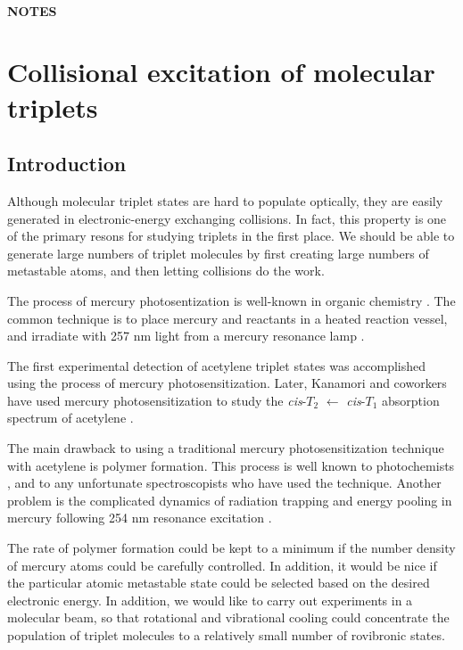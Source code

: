 \documentclass[12pt]{mitthesis}
\begin{document}
\tableofcontents
\clearpage

\subsubsection*{NOTES}
\clearpage

\chapter{Collisional excitation of molecular triplets}

\section{Introduction}


Although molecular triplet states are hard to populate optically, they
are easily generated in electronic-energy exchanging collisions.  In
fact, this property is one of the primary resons for studying triplets
in the first place.  We should be able to generate large numbers of
triplet molecules by first creating large numbers of metastable atoms,
and then letting collisions do the work.

The process of mercury photosentization is well-known in organic
chemistry \cite{brown89, brown88, crabtree92, cvetanovic64,
  phillips74, strausz70}.  The common technique is to place mercury
and reactants in a heated reaction vessel, and irradiate with 257 nm
light from a mercury resonance lamp \cite{brown87}.

The first experimental detection of acetylene triplet states was
accomplished using the process of mercury photosensitization.  Later,
Kanamori and coworkers have used mercury photosensitization to study
the \emph{cis}-$T_2$ $\leftarrow$ \emph{cis}-$T_1$ absorption spectrum
of acetylene \cite{kanamori07}.

The main drawback to using a traditional mercury photosensitization
technique with acetylene is polymer formation.  This process is well
known to photochemists \cite{shida58, leroy44}, and to any unfortunate
spectroscopists who have used the technique.  Another problem is the
complicated dynamics of radiation trapping and energy pooling in
mercury following 254 nm resonance excitation \cite{menningen00,
  herd05, majetich89, majetich91}.

The rate of polymer formation could be kept to a minimum if the number
density of mercury atoms could be carefully controlled.  In addition,
it would be nice if the particular atomic metastable state could be
selected based on the desired electronic energy.  In addition, we
would like to carry out experiments in a molecular beam, so that
rotational and vibrational cooling could concentrate the population of
triplet molecules to a relatively small number of rovibronic states.
\end{document}

